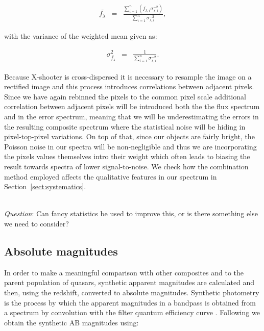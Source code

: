 \documentclass{aa}    %
\newcommand{\eqlabel}[1]{\label{eq:#1}}
\newcommand{\sectionname}{Section}
\newcommand{\Sect}[1]{\sectionname~\ref{sect:#1}}
\newcommand{\sect}[1]{\Sect{#1}}
\newcommand{\sectlabel}[1]{\label{sect:#1}}
\newcommand{\todo}[3]{{\color{#2}\emph{#1}: #3}}
\newcommand{\qtodo}[1]{\todo{\\ Question}{red}{#1}}
\begin{document}
\begin{eqnarray} \eqlabel{wmean}
\bar{f_{\lambda}} &=& \frac{ \sum_{i=1}^n \left( f_{\lambda, i} \sigma_{\lambda, i}^{-2} \right)}{\sum_{i=1}^n \sigma_{\lambda, i}^{-2}},
\end{eqnarray}

with the variance of the weighted mean given as: 
 
\begin{eqnarray} \eqlabel{sigma-wmean}
\sigma_{\bar{f_{\lambda}}}^2 &=& \frac{ 1 }{\sum_{i=1}^n \sigma_{\lambda, i}^{-2}}.
\end{eqnarray}

Because X-shooter is cross-dispersed it is necessary to resample the image on a rectified image and this process introduces correlations between adjacent pixels. Since we have again rebinned the pixels to the common pixel scale additional correlation between adjacent pixels will be introduced both the the flux spectrum and in the error spectrum, meaning that we will be underestimating the errors in the resulting composite spectrum where the statistical noise will be hiding in pixel-top-pixel variations. On top of that, since our objects are fairly bright, the Poisson noise in our spectra will be non-negligible and thus we are incorporating the pixels values themselves intro their weight which often leads to biasing the result towards spectra of lower signal-to-noise. We check how the combination method employed affects the qualitative features in our spectrum in \sect{systematics}.

\qtodo{Can fancy statistics be used to improve this, or is there something else we need to consider?}




\subsection{Absolute magnitudes} \sectlabel{absmag}

In order to make a meaningful comparison with other composites and to the parent population of quasars, synthetic apparent magnitudes are calculated and then, using the redshift, converted to absolute magnitudes. Synthetic photometry is the process by which the apparent magnitudes in a bandpass is obtained from a spectrum by convolution with the filter quantum efficiency curve \cite{Bessell2005}. Following \citep{Bessell2012, Casagrande2014} we obtain the synthetic AB magnitudes using:
\end{document}
